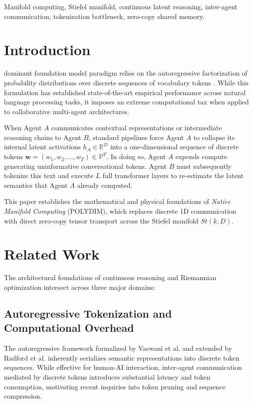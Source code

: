 \documentclass[journal,twocolumn]{IEEEtran}
\begin{document}
\begin{IEEEkeywords}
Manifold computing, Stiefel manifold, continuous latent reasoning, inter-agent communication, tokenization bottleneck, zero-copy shared memory.
\end{IEEEkeywords}

\section{Introduction}
 dominant foundation model paradigm relies on the autoregressive factorization of probability distributions over discrete sequences of vocabulary tokens \cite{vaswani2017attention,radford2019language}. While this formulation has established state-of-the-art empirical performance across natural language processing tasks, it imposes an extreme computational tax when applied to collaborative multi-agent architectures.

When Agent $A$ communicates contextual representations or intermediate reasoning chains to Agent $B$, standard pipelines force Agent $A$ to collapse its internal latent activations $h_A \in \mathbb{R}^D$ into a one-dimensional sequence of discrete tokens $\mathbf{w} = (w_1, w_2, \dots, w_T) \in \mathcal{V}^T$. In doing so, Agent $A$ expends compute generating uninformative conversational tokens. Agent $B$ must subsequently tokenize this text and execute $L$ full transformer layers to re-estimate the latent semantics that Agent $A$ already computed.

This paper establishes the mathematical and physical foundations of \textit{Native Manifold Computing} (POLYDIM), which replaces discrete 1D communication with direct zero-copy tensor transport across the Stiefel manifold $St(k, D)$.

\section{Related Work}
The architectural foundations of continuous reasoning and Riemannian optimization intersect across three major domains:

\subsection{Autoregressive Tokenization and Computational Overhead}
The autoregressive framework formalized by Vaswani et al. \cite{vaswani2017attention} and extended by Radford et al. \cite{radford2019language} inherently serializes semantic representations into discrete token sequences. While effective for human-AI interaction, inter-agent communication mediated by discrete tokens introduces substantial latency and token consumption, motivating recent inquiries into token pruning and sequence compression.
\end{document}
